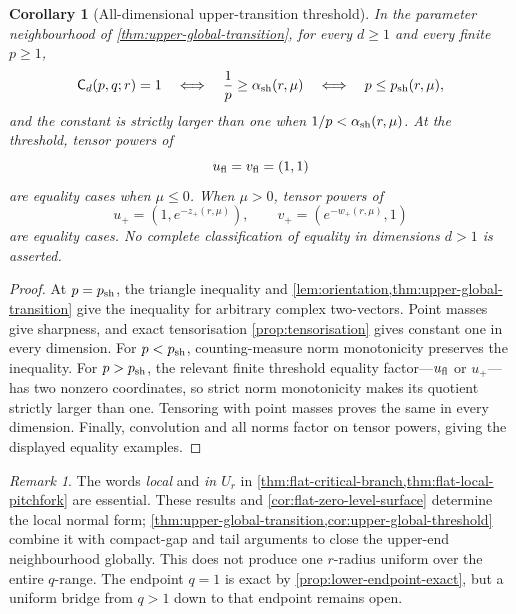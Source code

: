 \documentclass[11pt,reqno]{amsart}
\numberwithin{equation}{section}
\newtheorem{corollary}[corollary]{Corollary}
\theoremstyle{definition}
\theoremstyle{remark}
\newtheorem{remark}[remark]{Remark}
\newcommand{\Cpqr}{\mathsf C}
\begin{document}
\begin{corollary}[All-dimensional upper-transition threshold]
\label{cor:upper-global-threshold}
In the parameter neighbourhood of \cref{thm:upper-global-transition}, for every
$d\ge1$ and every finite $p\ge1$,
\begin{equation}\label{eq:upper-global-threshold}
  \Cpqr_d(p,q;r)=1
  \quad\Longleftrightarrow\quad
  \frac1p\ge\alpha_{\rm sh}(r,\mu)
  \quad\Longleftrightarrow\quad
  p\le p_{\rm sh}(r,\mu),
\end{equation}
and the constant is strictly larger than one when
$1/p<\alpha_{\rm sh}(r,\mu)$.  At the threshold, tensor powers of
\[
  u_{\rm fl}=v_{\rm fl}=(1,1)
\]
are equality cases when $\mu\le0$.  When $\mu>0$, tensor powers of
\begin{equation}\label{eq:upper-tensor-factors}
  u_+=\left(1,e^{-z_+(r,\mu)}\right),
  \qquad
  v_+=\left(e^{-w_+(r,\mu)},1\right)
\end{equation}
are equality cases.  No complete classification of equality in dimensions
$d>1$ is asserted.
\end{corollary}

\begin{proof}
At $p=p_{\rm sh}$, the triangle inequality and
\cref{lem:orientation,thm:upper-global-transition} give the inequality for
arbitrary complex two-vectors.  Point masses give sharpness, and exact
tensorisation \cref{prop:tensorisation} gives constant one in every dimension.
For $p<p_{\rm sh}$, counting-measure norm monotonicity preserves the inequality.
For $p>p_{\rm sh}$, the relevant finite threshold equality factor---$u_{\rm fl}$
or $u_+$---has two nonzero coordinates, so strict norm monotonicity makes its
quotient strictly larger than one.  Tensoring with point masses proves the same
in every dimension.  Finally, convolution and all norms factor on tensor
powers, giving the displayed equality examples.
\end{proof}

\begin{remark}\label{rem:flat-local-not-global}
The words \emph{local} and \emph{in $U_r$} in
\cref{thm:flat-critical-branch,thm:flat-local-pitchfork} are essential.  These
results and \cref{cor:flat-zero-level-surface} determine the local normal form;
\cref{thm:upper-global-transition,cor:upper-global-threshold} combine it with
compact-gap and tail arguments to close the upper-end neighbourhood globally.
This does not produce one $r$-radius uniform over the entire $q$-range.  The
endpoint $q=1$ is exact by \cref{prop:lower-endpoint-exact}, but a uniform bridge
from $q>1$ down to that endpoint remains open.
\end{remark}
\end{document}
